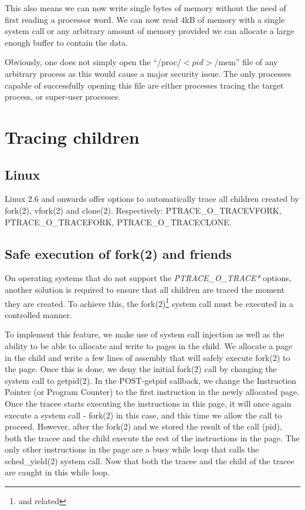 \documentclass[a4paper, twoside, 10pt, twocolumn]{report}
\begin{document}
This also means we can now write single bytes of memory without the need
of first reading a processor word. We can now read 4kB of memory with a
single system call or any arbitrary amount of memory provided we can allocate
a large enough buffer to contain the data.

Obviously, one does not simply open the ``/proc/$<pid>$/mem'' file of any
arbitrary process as this would cause a major security issue. The only
processes capable of successfully opening this file are either processes
tracing the target process, or super-user processes.


\section{Tracing children}

\subsection{Linux}

Linux 2.6 and onwards offer options to automatically trace all children
created by fork(2), vfork(2) and clone(2). Respectively:
PTRACE\_O\_TRACEVFORK, PTRACE\_O\_TRACEFORK, PTRACE\_O\_TRACECLONE.


\subsection{Safe execution of fork(2) and friends}

On operating systems that do not support the \textit{PTRACE\_O\_TRACE*} options,
another solution is required to ensure that all children are traced the moment
they are created. To achieve this, the fork(2)\footnote{and related} system call
must be executed in a controlled manner.

To implement this feature, we make use of system call injection as well as the
ability to be able to allocate and write to pages in the child. We allocate a
page in the child and write a few lines of assembly that will safely execute
fork(2) to the page. Once this is done, we deny the initial fork(2) call by
changing the system call to getpid(2). In the POST-getpid callback, we change
the Instruction Pointer (or Program Counter) to the first instruction in the
newly allocated page. Once the tracee starts executing the instructions in this
page, it will once again execute a system call - fork(2) in this case, and this
time we allow the call to proceed. However, after the fork(2) and we stored the
result of the call (pid), both the tracee and the child execute the rest of the
instructions in the page. The only other instructions in the page are a busy
while loop that calls the sched\_yield(2) system call. Now that both the tracee
and the child of the tracee are caught in this while loop.
\end{document}
